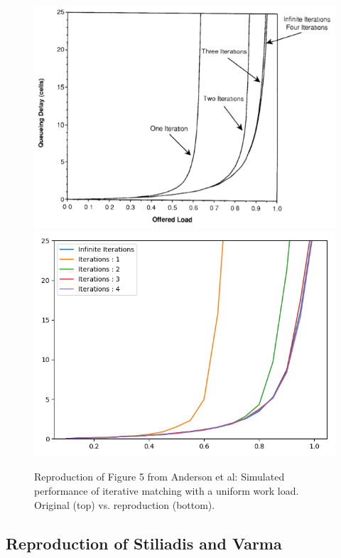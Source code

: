 \begin{figure}
    \centering
    \includegraphics[width=\linewidth]{figures/anderson_fig5_original.png}
    \includegraphics[width=\linewidth]{figures/anderson_fig5.png}
    \caption{Reproduction of Figure 5 from Anderson et al: Simulated performance of iterative matching with a uniform work load. Original (top) vs. reproduction (bottom).}
    \label{fig:5-anderson}
\end{figure}

\subsection{Reproduction of Stiliadis and Varma}

